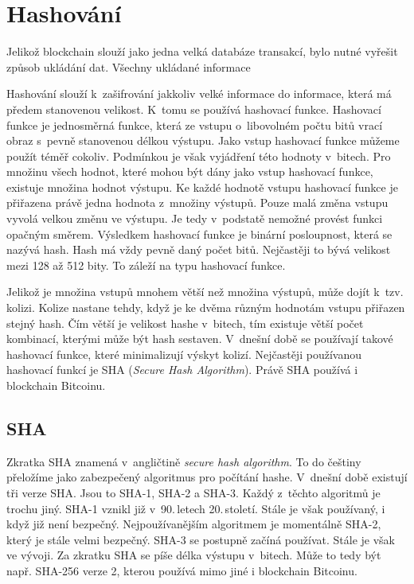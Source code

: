 \documentclass[12pt]{report}			%
\begin{document}
		\section{Hashování}{
Jelikož blockchain slouží jako jedna velká databáze transakcí, bylo nutné vyřešit způsob ukládání dat. Všechny ukládané informace 
		
Hashování slouží k~zašifrování jakkoliv velké informace do informace, která má předem stanovenou velikost. K~tomu se používá hashovací funkce. Hashovací funkce je jednosměrná funkce, která ze vstupu o~libovolném počtu bitů vrací obraz s~pevně stanovenou délkou výstupu. Jako vstup hashovací funkce můžeme použít téměř cokoliv. Podmínkou je však vyjádření této hodnoty v~bitech. Pro množinu všech hodnot, které mohou být dány jako vstup hashovací funkce, existuje množina hodnot výstupu. Ke každé hodnotě vstupu hashovací funkce je přiřazena právě jedna hodnota z~množiny výstupů. Pouze malá změna vstupu vyvolá velkou změnu ve výstupu. Je tedy v~podstatě nemožné provést funkci opačným směrem. Výsledkem hashovací funkce je binární posloupnost, která se nazývá hash. Hash má vždy pevně daný počet bitů. Nejčastěji to bývá velikost mezi 128 až 512 bity. To záleží na typu hashovací funkce.\cite{Burda2013}

Jelikož je množina vstupů mnohem větší než množina výstupů, může dojít k~tzv.\,kolizi. Kolize nastane tehdy, když je ke dvěma různým hodnotám vstupu přiřazen stejný hash. Čím větší je velikost hashe v~bitech, tím existuje větší počet kombinací, kterými může být hash sestaven. V~dnešní době se používají takové hashovací funkce, které minimalizují výskyt kolizí. Nejčastěji používanou hashovací funkcí je SHA (\textit{Secure Hash Algorithm}). Právě SHA používá i blockchain Bitcoinu.\cite{Burda2013}
}
		\subsection{SHA}{
Zkratka SHA znamená v~angličtině \textit{secure hash algorithm}. To do češtiny přeložíme jako zabezpečený algoritmus pro počítání hashe. V~dnešní době existují tři verze SHA. Jsou to SHA-1, SHA-2 a SHA-3. Každý z~těchto algoritmů je trochu jiný. SHA-1 vznikl již v~90.\,letech 20.\,století. Stále je však používaný, i když již není bezpečný. Nejpoužívanějším algoritmem je momentálně SHA-2, který je stále velmi bezpečný. SHA-3 se postupně začíná používat. Stále je však ve vývoji. Za zkratku SHA se píše délka výstupu v~bitech. Může to tedy být např. SHA-256 verze 2, kterou používá mimo jiné i blockchain Bitcoinu.  \cite{Burda2013} \cite{Antonopoulos2017}
}
\end{document}
